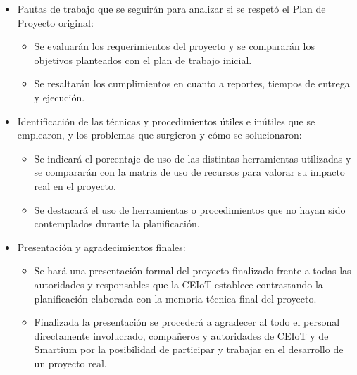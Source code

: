 \documentclass[11pt]{charter}
\begin{document}
\begin{itemize}
\item Pautas de trabajo que se seguirán para analizar si se respetó el Plan de Proyecto original:
	\begin{itemize}
	\item Se evaluarán los requerimientos del proyecto y se compararán los objetivos planteados con el plan de trabajo inicial. 
	\item Se resaltarán los cumplimientos en cuanto a reportes, tiempos de entrega y ejecución. 
	\end{itemize}

\item Identificación de las técnicas y procedimientos útiles e inútiles que se emplearon, y los problemas que surgieron y cómo se solucionaron:
	\begin{itemize}
	\item Se indicará el porcentaje de uso de las distintas herramientas utilizadas y se compararán con la matriz de uso de recursos para valorar su impacto real en el proyecto. 
	\item Se destacará el uso de herramientas o procedimientos que no hayan sido contemplados durante la planificación. 
	\end{itemize}

\item Presentación y agradecimientos finales:
	\begin{itemize}
	\item Se hará una presentación formal del proyecto finalizado frente a todas las autoridades y responsables que la CEIoT establece contrastando la planificación elaborada con la memoria técnica final del proyecto. 
	\item Finalizada la presentación se procederá a agradecer al todo el personal directamente involucrado, compañeros y autoridades de CEIoT y de Smartium por la posibilidad de participar y trabajar en el desarrollo de un proyecto real. 
	
	\end{itemize}
\end{itemize}
\end{document}
